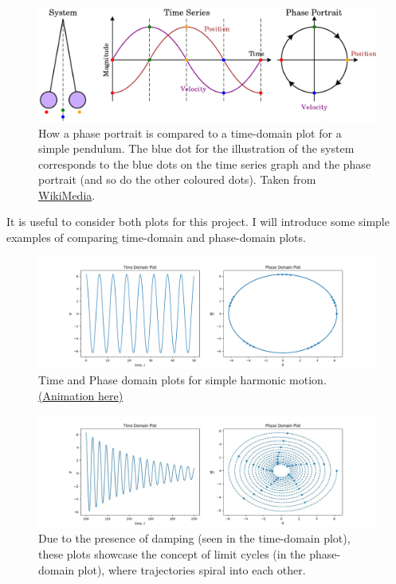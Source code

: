 \documentclass[10pt, twocolumn]{article}
\begin{document}
\begin{figure}[H]
    \centering  
    \includegraphics[width = 0.7\columnwidth]{Projects/ForcedSimplePendulum/WrittenReport/figs/Pendulum_phase_portrait_illustration.svg.png}
    \caption{How a phase portrait is compared to a time-domain plot for a simple pendulum. The blue dot for the illustration of the system corresponds to the blue dots on the time series graph and the phase portrait (and so do the other coloured dots). Taken from \href{https://commons.wikimedia.org/wiki/File:Pendulum_phase_portrait_illustration.svg}{WikiMedia}.}
    \label{fig:enter-label}
\end{figure}
 It is useful to consider both plots for this project. I will introduce some simple examples of comparing time-domain and phase-domain plots.
 \begin{figure}[H]
     \centering
     \includegraphics[width = \columnwidth]{Projects/ForcedSimplePendulum/Plots/demo_shm.png}
     \caption{Time and Phase domain plots for simple harmonic motion. \href{https://github.com/linsuong/PHYS-6017-Labs/blob/main/Projects/ForcedSimplePendulum/Plots/demo_shm.gif}{(Animation here)}}
     \label{fig:enter-label}
 \end{figure}

 \begin{figure}[H]
     \centering
     \includegraphics[width = \columnwidth]{Projects/ForcedSimplePendulum/Plots/demo_limit_cycles.jpg}
     \caption{Due to the presence of damping (seen in the time-domain plot), these plots showcase the concept of limit cycles (in the phase-domain plot), where trajectories spiral into each other.}
     \label{fig:enter-label}
 \end{figure}
\end{document}
